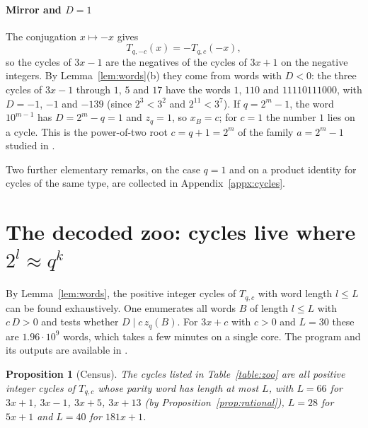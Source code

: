 \documentclass[12pt]{amsart}
\newtheorem{proposition}{Proposition}
\theoremstyle{definition}
\theoremstyle{remark}
\begin{document}
\paragraph{Mirror and $D=1$} The conjugation $x\mapsto-x$ gives
\begin{equation}
\label{eq:mirror}
T_{q,-c}(x)=-T_{q,c}(-x),
\end{equation}
so the cycles of $3x-1$ are the negatives of the cycles of $3x+1$ on the negative integers. By Lemma~\ref{lem:words}(b) they come from words with $D<0$: the three cycles of $3x-1$ through $1$, $5$ and $17$ have the words $1$, $110$ and $11110111000$, with $D=-1$, $-1$ and $-139$ (since $2^3<3^2$ and $2^{11}<3^7$). If $q=2^m-1$, the word $10^{m-1}$ has $D=2^m-q=1$ and $z_q=1$, so $x_B=c$; for $c=1$ the number $1$ lies on a cycle. This is the power-of-two root $c=q+1=2^m$ of the family $a=2^m-1$ studied in \cite{Kleinnijenhuis_2026}.

Two further elementary remarks, on the case $q=1$ and on a product identity for cycles of the same type, are collected in Appendix~\ref{appx:cycles}.

\section{The decoded zoo: cycles live where \texorpdfstring{$2^l\approx q^k$}{2\^{}l ≈ q\^{}k}}
\label{sec:zoo}
By Lemma~\ref{lem:words}, the positive integer cycles of $T_{q,c}$ with word length $l\le L$ can be found exhaustively. One enumerates all words $B$ of length $l\le L$ with $c\,D>0$ and tests whether $D\mid c\,z_q(B)$. For $3x+c$ with $c>0$ and $L=30$ these are $1.96\cdot10^9$ words, which takes a few minutes on a single core. The program and its outputs are available in \cite{Sultanow_collatz_07}.

\begin{proposition}[Census]
\label{prop:census}
The cycles listed in Table~\ref{table:zoo} are all positive integer cycles of $T_{q,c}$ whose parity word has length at most $L$, with $L=66$ for $3x+1$, $3x-1$, $3x+5$, $3x+13$ (by Proposition~\ref{prop:rational}), $L=28$ for $5x+1$ and $L=40$ for $181x+1$.
\end{proposition}
\end{document}
